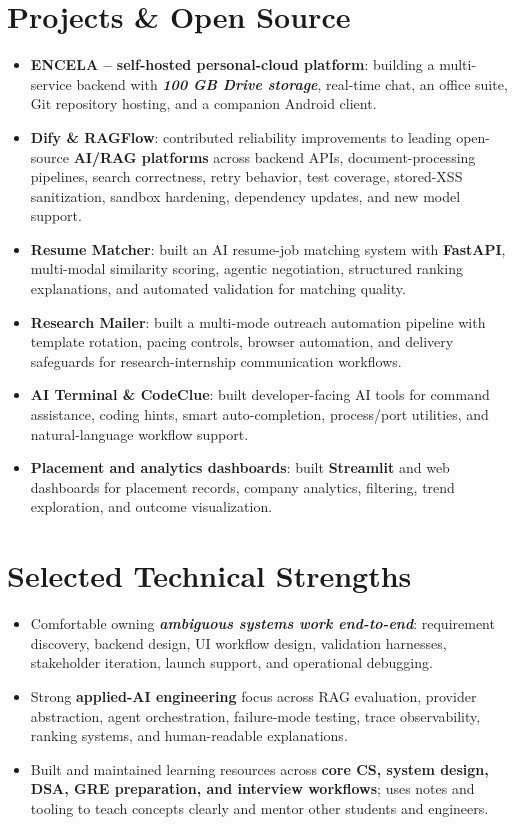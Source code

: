 \documentclass[10pt,a4paper]{article}
\newcommand{\metric}[1]{\textbf{\textit{#1}}}
\newcommand{\tech}[1]{\textbf{#1}}
\newcommand{\project}[1]{\textbf{#1}}
\begin{document}
\section{Projects \& Open Source}
\begin{itemize}
  \item \project{ENCELA -- self-hosted personal-cloud platform}: building a multi-service backend with \metric{100 GB Drive storage}, real-time chat, an office suite, Git repository hosting, and a companion Android client.
  \item \project{Dify \& RAGFlow}: contributed reliability improvements to leading open-source \tech{AI/RAG platforms} across backend APIs, document-processing pipelines, search correctness, retry behavior, test coverage, stored-XSS sanitization, sandbox hardening, dependency updates, and new model support.
  \item \project{Resume Matcher}: built an AI resume-job matching system with \tech{FastAPI}, multi-modal similarity scoring, agentic negotiation, structured ranking explanations, and automated validation for matching quality.
  \item \project{Research Mailer}: built a multi-mode outreach automation pipeline with template rotation, pacing controls, browser automation, and delivery safeguards for research-internship communication workflows.
  \item \project{AI Terminal \& CodeClue}: built developer-facing AI tools for command assistance, coding hints, smart auto-completion, process/port utilities, and natural-language workflow support.
  \item \project{Placement and analytics dashboards}: built \tech{Streamlit} and web dashboards for placement records, company analytics, filtering, trend exploration, and outcome visualization.
\end{itemize}

\section{Selected Technical Strengths}
\begin{itemize}
  \item Comfortable owning \metric{ambiguous systems work end-to-end}: requirement discovery, backend design, UI workflow design, validation harnesses, stakeholder iteration, launch support, and operational debugging.
  \item Strong \tech{applied-AI engineering} focus across RAG evaluation, provider abstraction, agent orchestration, failure-mode testing, trace observability, ranking systems, and human-readable explanations.
  \item Built and maintained learning resources across \tech{core CS, system design, DSA, GRE preparation, and interview workflows}; uses notes and tooling to teach concepts clearly and mentor other students and engineers.
\end{itemize}
\end{document}
